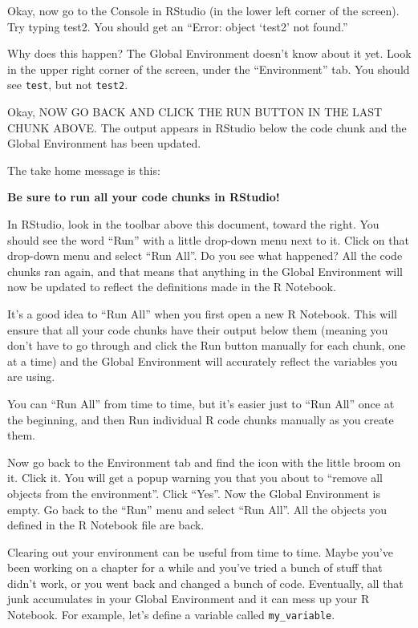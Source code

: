 \documentclass[
]{book}
\begin{document}
Okay, now go to the Console in RStudio (in the lower left corner of the screen). Try typing test2. You should get an ``Error: object `test2' not found.''

Why does this happen? The Global Environment doesn't know about it yet. Look in the upper right corner of the screen, under the ``Environment'' tab. You should see \texttt{test}, but not \texttt{test2}.

Okay, NOW GO BACK AND CLICK THE RUN BUTTON IN THE LAST CHUNK ABOVE. The output appears in RStudio below the code chunk and the Global Environment has been updated.

The take home message is this:

\textbf{Be sure to run all your code chunks in RStudio!}

In RStudio, look in the toolbar above this document, toward the right. You should see the word ``Run'' with a little drop-down menu next to it. Click on that drop-down menu and select ``Run All''. Do you see what happened? All the code chunks ran again, and that means that anything in the Global Environment will now be updated to reflect the definitions made in the R Notebook.

It's a good idea to ``Run All'' when you first open a new R Notebook. This will ensure that all your code chunks have their output below them (meaning you don't have to go through and click the Run button manually for each chunk, one at a time) and the Global Environment will accurately reflect the variables you are using.

You can ``Run All'' from time to time, but it's easier just to ``Run All'' once at the beginning, and then Run individual R code chunks manually as you create them.

Now go back to the Environment tab and find the icon with the little broom on it. Click it. You will get a popup warning you that you about to ``remove all objects from the environment''. Click ``Yes''. Now the Global Environment is empty. Go back to the ``Run'' menu and select ``Run All''. All the objects you defined in the R Notebook file are back.

Clearing out your environment can be useful from time to time. Maybe you've been working on a chapter for a while and you've tried a bunch of stuff that didn't work, or you went back and changed a bunch of code. Eventually, all that junk accumulates in your Global Environment and it can mess up your R Notebook. For example, let's define a variable called \texttt{my\_variable}.
\end{document}
